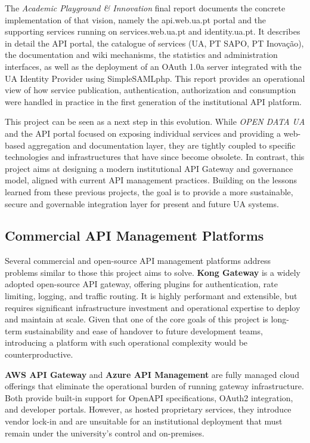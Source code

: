 \documentclass[12pt, a4paper]{report}
\begin{document}
The \emph{Academic Playground \& Innovation} final report documents the
concrete implementation of that vision, namely the api.web.ua.pt portal and
the supporting services running on services.web.ua.pt and identity.ua.pt.
It describes in detail the API portal, the catalogue of services (UA, PT SAPO,
PT Inovação), the documentation and wiki mechanisms, the statistics and
administration interfaces, as well as the deployment of an OAuth 1.0a server
integrated with the UA Identity Provider using SimpleSAMLphp. This
report provides an operational view of how service publication, authentication,
authorization and consumption were handled in practice in the first generation
of the institutional API platform.

This project can be seen as a next step in this evolution. While \emph{OPEN DATA
UA} and the API portal focused on exposing individual services and providing a
web-based aggregation and documentation layer, they are tightly coupled to
specific technologies and infrastructures that have since become obsolete.
In contrast, this project aims at designing a modern institutional API Gateway
and governance model, aligned with current API management practices. Building
on the lessons learned from these previous projects, the goal is to provide
a more sustainable, secure and governable integration layer for present and
future UA systems.

\subsection{Commercial API Management Platforms}

Several commercial and open-source API management platforms address problems
similar to those this project aims to solve. \textbf{Kong Gateway} is a widely adopted
open-source API gateway, offering plugins for authentication,
rate limiting, logging, and traffic routing. It is highly performant and extensible,
but requires significant infrastructure investment and operational expertise to deploy
and maintain at scale. Given that one of the core goals of this project is long-term
sustainability and ease of handover to future development teams, introducing a platform
with such operational complexity would be counterproductive.

\textbf{AWS API Gateway} and \textbf{Azure API Management} are fully managed cloud
offerings that eliminate the operational burden of running gateway infrastructure.
Both provide built-in support for OpenAPI specifications, OAuth2 integration, and
developer portals. However, as hosted proprietary services, they introduce vendor
lock-in and are unsuitable for an institutional deployment that must remain under
the university's control and on-premises.
\end{document}
